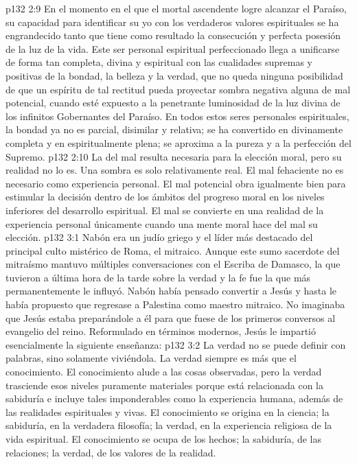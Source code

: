 \vs p132 2:9 En el momento en el que el mortal ascendente logre alcanzar el Paraíso, su capacidad para identificar su yo con los verdaderos valores espirituales se ha engrandecido tanto que tiene como resultado la consecución y perfecta posesión de la luz de la vida. Este ser personal espiritual perfeccionado llega a unificarse de forma tan completa, divina y espiritual con las cualidades supremas y positivas de la bondad, la belleza y la verdad, que no queda ninguna posibilidad de que un espíritu de tal rectitud pueda proyectar sombra negativa alguna de mal potencial, cuando esté expuesto a la penetrante luminosidad de la luz divina de los infinitos Gobernantes del Paraíso. En todos estos seres personales espirituales, la bondad ya no es parcial, disimilar y relativa; se ha convertido en divinamente completa y en espiritualmente plena; se aproxima a la pureza y a la perfección del Supremo.
\vs p132 2:10 La  del mal resulta necesaria para la elección moral, pero su realidad no lo es. Una sombra es solo relativamente real. El mal fehaciente no es necesario como experiencia personal. El mal potencial obra igualmente bien para estimular la decisión dentro de los ámbitos del progreso moral en los niveles inferiores del desarrollo espiritual. El mal se convierte en una realidad de la experiencia personal únicamente cuando una mente moral hace del mal su elección.
\vs p132 3:1 Nabón era un judío griego y el líder más destacado del principal culto mistérico de Roma, el mitraico. Aunque este sumo sacerdote del mitraísmo mantuvo múltiples conversaciones con el Escriba de Damasco, la que tuvieron a última hora de la tarde sobre la verdad y la fe fue la que más permanentemente le influyó. Nabón había pensado convertir a Jesús y hasta le había propuesto que regresase a Palestina como maestro mitraico. No imaginaba que Jesús estaba preparándole a él para que fuese de los primeros conversos al evangelio del reino. Reformulado en términos modernos, Jesús le impartió esencialmente la siguiente enseñanza:
\vs p132 3:2 \pc La verdad no se puede definir con palabras, sino solamente viviéndola. La verdad siempre es más que el conocimiento. El conocimiento alude a las cosas observadas, pero la verdad trasciende esos niveles puramente materiales porque está relacionada con la sabiduría e incluye tales imponderables como la experiencia humana, además de las realidades espirituales y vivas. El conocimiento se origina en la ciencia; la sabiduría, en la verdadera filosofía; la verdad, en la experiencia religiosa de la vida espiritual. El conocimiento se ocupa de los hechos; la sabiduría, de las relaciones; la verdad, de los valores de la realidad.
